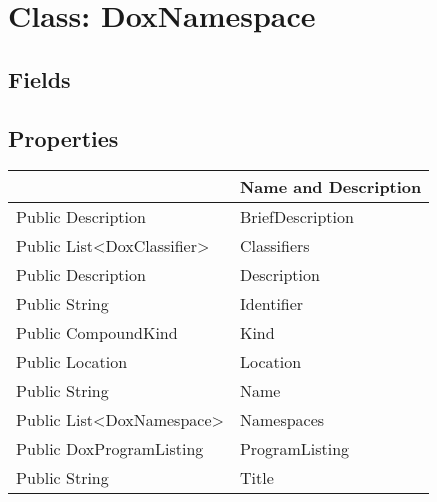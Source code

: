 \documentclass[11pt, oneside, a4paper]{book}
\begin{document}
\hypertarget{SoftwareEngineeringTools.{}Documentation.{}DoxNamespace}{}
\section{Class: DoxNamespace}

\subsection{Fields}

\subsection{Properties}
\begin{center}
\begin{tabular}{| p{3cm} | p{12cm} | }
\hline
\textbf{ } & \textbf{ Name and Description}\\
\hline
 Public  Description &  BriefDescription\hypertarget{SoftwareEngineeringTools.{}Documentation.{}DoxNamespace.{}BriefDescription}{}\\
\hline
 Public  List<DoxClassifier> &  Classifiers\hypertarget{SoftwareEngineeringTools.{}Documentation.{}DoxNamespace.{}Classifiers}{}\\
\hline
 Public  Description &  Description\hypertarget{SoftwareEngineeringTools.{}Documentation.{}DoxNamespace.{}Description}{}\\
\hline
 Public  String &  Identifier\hypertarget{SoftwareEngineeringTools.{}Documentation.{}DoxNamespace.{}Identifier}{}\\
\hline
 Public  CompoundKind &  Kind\hypertarget{SoftwareEngineeringTools.{}Documentation.{}DoxNamespace.{}Kind}{}\\
\hline
 Public  Location &  Location\hypertarget{SoftwareEngineeringTools.{}Documentation.{}DoxNamespace.{}Location}{}\\
\hline
 Public  String &  Name\hypertarget{SoftwareEngineeringTools.{}Documentation.{}DoxNamespace.{}Name}{}\\
\hline
 Public  List<DoxNamespace> &  Namespaces\hypertarget{SoftwareEngineeringTools.{}Documentation.{}DoxNamespace.{}Namespaces}{}\\
\hline
 Public  DoxProgramListing &  ProgramListing\hypertarget{SoftwareEngineeringTools.{}Documentation.{}DoxNamespace.{}ProgramListing}{}\\
\hline
 Public  String &  Title\hypertarget{SoftwareEngineeringTools.{}Documentation.{}DoxNamespace.{}Title}{}\\
\hline
\end{tabular}
\end{center}
\end{document}
